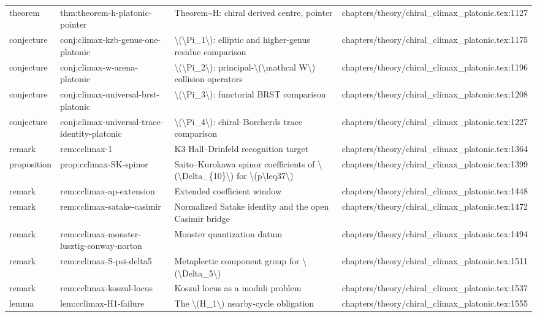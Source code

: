 \documentclass[11pt]{article}
\begin{document}
\begin{longtable}{L{0.10\textwidth}L{0.26\textwidth}L{0.42\textwidth}L{0.22\textwidth}}
theorem & thm:theorem-h-platonic-pointer & Theorem\textasciitilde{}H: chiral derived centre, pointer & chapters/theory/chiral\_climax\_platonic.tex:1127\\
conjecture & conj:climax-kzb-genus-one-platonic & \textbackslash{}(\textbackslash{}Pi\_1\textbackslash{}): elliptic and higher-genus residue comparison & chapters/theory/chiral\_climax\_platonic.tex:1175\\
conjecture & conj:climax-w-arena-platonic & \textbackslash{}(\textbackslash{}Pi\_2\textbackslash{}): principal-\textbackslash{}(\textbackslash{}mathcal W\textbackslash{}) collision operators & chapters/theory/chiral\_climax\_platonic.tex:1196\\
conjecture & conj:climax-universal-brst-platonic & \textbackslash{}(\textbackslash{}Pi\_3\textbackslash{}): functorial BRST comparison & chapters/theory/chiral\_climax\_platonic.tex:1208\\
conjecture & conj:climax-universal-trace-identity-platonic & \textbackslash{}(\textbackslash{}Pi\_4\textbackslash{}): chiral--Borcherds trace comparison & chapters/theory/chiral\_climax\_platonic.tex:1227\\
remark & rem:cclimax-1 & K3 Hall--Drinfeld recognition target & chapters/theory/chiral\_climax\_platonic.tex:1364\\
proposition & prop:cclimax-SK-spinor & Saito--Kurokawa spinor coefficients of \textbackslash{}(\textbackslash{}Delta\_\{10\}\textbackslash{}) for \textbackslash{}(p\textbackslash{}leq37\textbackslash{}) & chapters/theory/chiral\_climax\_platonic.tex:1399\\
remark & rem:cclimax-ap-extension & Extended coefficient window & chapters/theory/chiral\_climax\_platonic.tex:1448\\
remark & rem:cclimax-satake-casimir & Normalized Satake identity and the op{}en Casimir bridge & chapters/theory/chiral\_climax\_platonic.tex:1472\\
remark & rem:cclimax-monster-lusztig-conway-norton & Monster quantization datum & chapters/theory/chiral\_climax\_platonic.tex:1494\\
remark & rem:cclimax-S-psi-delta5 & Metaplectic component group for \textbackslash{}(\textbackslash{}Delta\_5\textbackslash{}) & chapters/theory/chiral\_climax\_platonic.tex:1511\\
remark & rem:cclimax-koszul-locus & Koszul locus as a moduli problem & chapters/theory/chiral\_climax\_platonic.tex:1537\\
lemma & lem:cclimax-H1-failure & The \textbackslash{}(H\_1\textbackslash{}) nearby-cycle obligation & chapters/theory/chiral\_climax\_platonic.tex:1555\\

\end{longtable}
\end{document}
